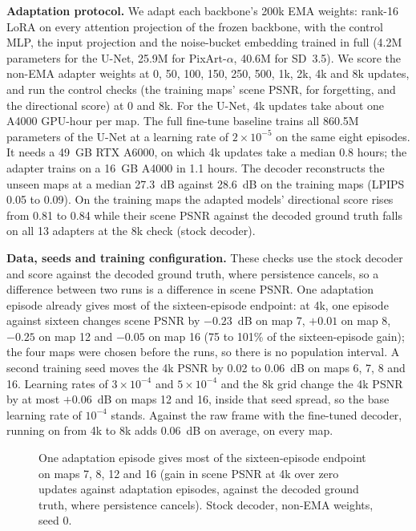 \textbf{Adaptation protocol.} We adapt each backbone's 200k EMA weights: rank-16 LoRA on every attention projection of the frozen backbone, with the control MLP, the input projection and the noise-bucket embedding trained in full (4.2M parameters for the U-Net, 25.9M for PixArt-$\alpha$, 40.6M for SD~3.5). We score the non-EMA adapter weights at 0, 50, 100, 150, 250, 500, 1k, 2k, 4k and 8k updates, and run the control checks (the training maps' scene PSNR, for forgetting, and the directional score) at 0 and 8k. For the U-Net, 4k updates take about one A4000 GPU-hour per map. The full fine-tune baseline trains all 860.5M parameters of the U-Net at a learning rate of $2\times10^{-5}$ on the same eight episodes. It needs a 49~GB RTX A6000, on which 4k updates take a median 0.8 hours; the adapter trains on a 16~GB A4000 in 1.1 hours. The decoder reconstructs the unseen maps at a median 27.3~dB against 28.6~dB on the training maps (LPIPS 0.05 to 0.09). On the training maps the adapted models' directional score rises from 0.81 to 0.84 while their scene PSNR against the decoded ground truth falls on all 13 adapters at the 8k check (stock decoder).

\textbf{Data, seeds and training configuration.} These checks use the stock decoder and score against the decoded ground truth, where persistence cancels, so a difference between two runs is a difference in scene PSNR. One adaptation episode already gives most of the sixteen-episode endpoint: at 4k, one episode against sixteen changes scene PSNR by $-0.23$~dB on map 7, $+0.01$ on map 8, $-0.25$ on map 12 and $-0.05$ on map 16 (75 to 101\% of the sixteen-episode gain); the four maps were chosen before the runs, so there is no population interval. A second training seed moves the 4k PSNR by 0.02 to 0.06~dB on maps 6, 7, 8 and 16. Learning rates of $3\times10^{-4}$ and $5\times10^{-4}$ and the 8k grid change the 4k PSNR by at most $+0.06$~dB on maps 12 and 16, inside that seed spread, so the base learning rate of $10^{-4}$ stands. Against the raw frame with the fine-tuned decoder, running on from 4k to 8k adds 0.06~dB on average, on every map.

\begin{figure}[ht]
\centering
{}
\caption{One adaptation episode gives most of the sixteen-episode endpoint on maps 7, 8, 12 and 16 (gain in scene PSNR at 4k over zero updates against adaptation episodes, against the decoded ground truth, where persistence cancels). Stock decoder, non-EMA weights, seed 0.}
\label{fig:adapt-ladder}
\end{figure}

